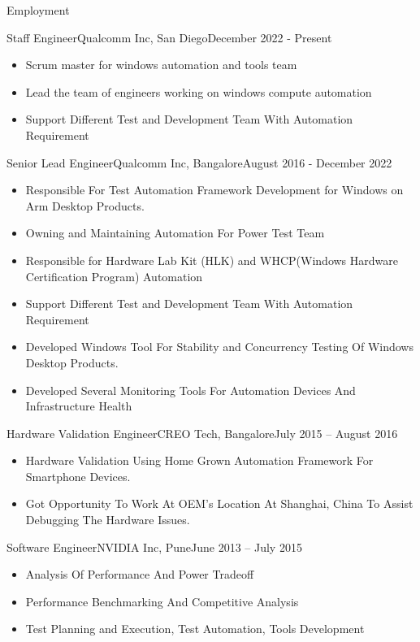 \documentclass[]{mcdowellcv}
\begin{document}
	\makeheader
	
	\begin{cvsection}{Employment}
		\begin{cvsubsection}{Staff Engineer}{Qualcomm Inc, San Diego}{December 2022 - Present}		
			\begin{itemize}
			\item Scrum master for windows automation and tools team
			\item Lead the team of engineers working on windows compute automation
			\item Support Different Test and Development Team With Automation Requirement		
			\end{itemize}
		\end{cvsubsection}
		\begin{cvsubsection}{Senior Lead Engineer}{Qualcomm Inc, Bangalore}{August 2016 - December 2022}		
			\begin{itemize}
			\item Responsible For Test Automation Framework Development for Windows on Arm Desktop Products.
			\item Owning and Maintaining Automation For Power Test Team 
			\item Responsible for Hardware Lab Kit (HLK) and WHCP(Windows Hardware Certification Program) Automation
			\item Support Different Test and Development Team With Automation Requirement
			\item Developed Windows Tool For Stability and Concurrency Testing Of Windows Desktop Products.
			\item Developed Several Monitoring Tools For Automation Devices And Infrastructure Health			
		\end{itemize}
		\end{cvsubsection}
		\begin{cvsubsection}{Hardware Validation Engineer}{CREO Tech, Bangalore}{July 2015 -- August 2016}	
			\begin{itemize}
				\item Hardware Validation Using Home Grown Automation Framework For Smartphone Devices.
				\item Got Opportunity To Work At OEM's Location At Shanghai, China To Assist Debugging The Hardware Issues.
			\end{itemize}
		\end{cvsubsection}
		
		\begin{cvsubsection}{Software Engineer}{NVIDIA Inc, Pune}{June 2013 -- July 2015}		
			\begin{itemize}
				\item Analysis Of Performance And Power Tradeoff 
				\item Performance Benchmarking And Competitive Analysis
				\item Test Planning and Execution, Test Automation, Tools Development 
			\end{itemize}
		\end{cvsubsection}
		
	\end{cvsection}
	
\end{document}
